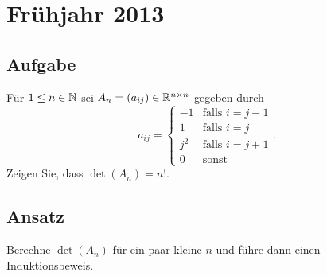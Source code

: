 \newpage

\section{Frühjahr 2013}

\subsection{Aufgabe}
Für \( 1 \leq n \in \mathbb{N} \) sei \( A_n = (a_{ij}) \in \mathbb{R}^{n \times n} \) gegeben durch
\begin{equation*}
	a_{ij} = \begin{cases}
		-1 &\text{falls } i = j-1 \\
		1 &\text{falls } i = j \\
		j^2 &\text{falls } i = j+1 \\
		0 &\text{sonst}
	\end{cases}\text{.}
\end{equation*}
Zeigen Sie, dass \( \det(A_n) = n! \).

\subsection{Ansatz}
Berechne \( \det(A_n) \) für ein paar kleine \( n \) und führe dann einen Induktionsbeweis.

